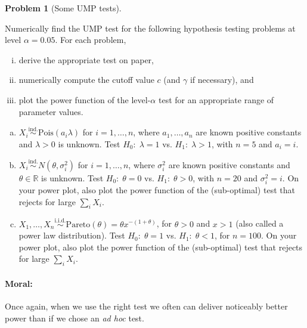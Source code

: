 \documentclass{article}
\newcommand{\RR}{\mathbb{R}}
\newcommand{\simiid}{\overset{\text{i.i.d.}}{\sim}}
\newcommand{\simind}{\overset{\text{ind.}}{\sim}}
\theoremstyle{definition}
\newtheorem{problem}{Problem}
\begin{document}
\begin{problem}[Some UMP tests]
\label{prob:some-ump-tests}

Numerically find the UMP test for the following hypothesis testing problems at level $\alpha=0.05$. For each problem,
\begin{enumerate}[(i)]
\item derive the appropriate test on paper, 
\item numerically compute the cutoff value $c$ (and $\gamma$ if necessary), and 
\item plot the power function of the level-$\alpha$ test for an appropriate range of parameter values.
\end{enumerate}

\begin{enumerate}[(a)]


\item $X_i \simind \text{Pois}(a_i \lambda)$ for $i=1,\ldots,n$, where $a_1,\ldots,a_n$ are known positive constants and $\lambda > 0$ is unknown. Test $H_0:\; \lambda = 1$ vs. $H_1:\; \lambda > 1$, with $n = 5$ and $a_i = i$.




\item $X_i \simind N(\theta, \sigma_i^2)$ for $i=1,\ldots,n$, where $\sigma_i^2$ are known positive constants and $\theta \in \RR$ is unknown. Test $H_0:\; \theta = 0$ vs. $H_1:\; \theta > 0$, with $n = 20$ and $\sigma_i^2 = i$. On your power plot, also plot the power function of the (sub-optimal) test that rejects for large $\sum_i X_i$.





\item $X_1,\ldots, X_n \simiid \text{Pareto}(\theta) = \theta x^{-(1+\theta)}$, for $\theta > 0$ and $x > 1$ (also called a power law distribution). Test $H_0:\; \theta = 1$ vs. $H_1:\; \theta < 1$, for $n = 100$. On your power plot, also plot the power function of the (sub-optimal) test that rejects for large $\sum_i X_i$.




\end{enumerate}

\paragraph{Moral:} Once again, when we use the right test we often can deliver noticeably better power than if we chose an {\em ad hoc} test.
\end{problem}
\end{document}
